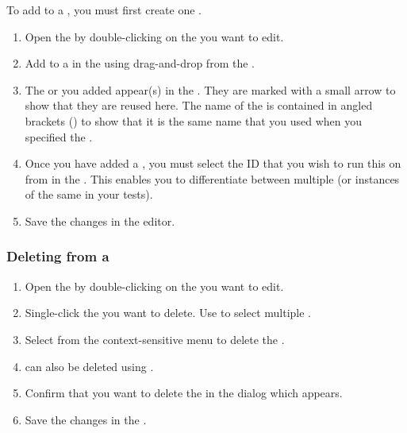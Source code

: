 \label{AddSuiteToJob}

To add \gdsuites{} to a \gdjob{}, you must first create one .

\begin{enumerate}
\item Open the \gdjobeditor{} by double-clicking on the \gdjob{} you want to edit.


\item Add \gdsuites{} to a \gdjob{} in the \gdjobeditor{} using drag-and-drop from the \gdtestsuitebrowser{}.


  \item The \gdsuite{} or \gdsuites{} you added appear(s) in the \gdjobeditor{}. They are marked with a small arrow to show that they are reused here. The name of the \gdjob{} is contained in angled brackets (\bxshell{< >}) to show that it is the same name that you used when you specified the \gdsuite{}. 

\item Once you have added a \gdsuite{}, you must select the \gdaut{} ID that you wish to run this \gdsuite{} on from in the \gdpropview{}. This enables you to differentiate between multiple \gdauts{} (or instances of the same \gdaut{} in your tests). 
\item Save the changes in the editor.

\end{enumerate}

\subsubsection{Deleting \gdsuites{} from a \gdjob{}}
\label{TasksDeleteSuiteJob}

\begin{enumerate}
\item Open the \gdjobeditor{} by double-clicking on the \gdjob{} you want to edit.
\item  Single-click the \gdsuite{} you want to delete. Use   to select multiple \gdsuites{}. 
\item Select  from the context-sensitive menu to delete the \gdsuites{}.
\item \gdsuites{} can also be deleted using .
\item Confirm that you want to delete the \gdsuites{} in the dialog which appears.
\item Save the changes in the \gdjobeditor{}. 

\end{enumerate}


